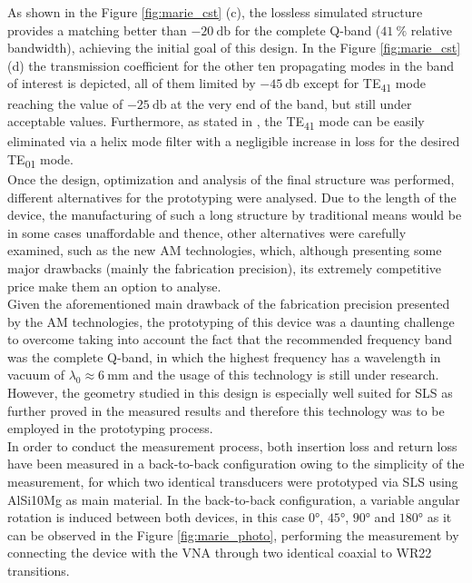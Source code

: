 \documentclass[english,twoside]{article}
\begin{document}
    As shown in the Figure \ref{fig:marie_cst} (c), the lossless simulated structure provides a matching better than $\SI{-20}{\decibel}$ for the complete Q-band ($\SI{41}{\percent}$ relative bandwidth), achieving the initial goal of this design. In the Figure \ref{fig:marie_cst} (d) the transmission coefficient for the other ten propagating modes in the band of interest is depicted, all of them limited by $\SI{-45}{\decibel}$ except for \ac{TE}\textsubscript{41} mode reaching the value of $\SI{-25}{\decibel}$ at the very end of the band, but still under acceptable values. Furthermore, as stated in \cite{saad}, the \ac{TE}\textsubscript{41} mode can be easily eliminated via a helix mode filter with a negligible increase in loss for the desired \ac{TE}\textsubscript{01} mode.\\
    
    Once the design, optimization and analysis of the final structure was performed, different alternatives for the prototyping were analysed. Due to the length of the device, the manufacturing of such a long structure by traditional means would be in some cases unaffordable and thence, other alternatives were carefully examined, such as the new \ac{AM} technologies, which, although presenting some major drawbacks (mainly the fabrication precision), its extremely competitive price make them an option to analyse.\\
    
    Given the aforementioned main drawback of the fabrication precision presented by the \ac{AM} technologies, the prototyping of this device was a daunting challenge to overcome taking into account the fact that the recommended frequency band was the complete Q-band, in which the highest frequency has a wavelength in vacuum of $\lambda_0\approx\SI{6}{\milli\metre}$ and the usage of this technology is still under research. However, the geometry studied in this design is especially well suited for \ac{SLS} as further proved in the measured results \cite{gonzalez} and therefore this technology was to be employed in the prototyping process.\\
    
    In order to conduct the measurement process, both insertion loss and return loss have been measured in a back-to-back configuration owing to the simplicity of the measurement, for which two identical transducers were prototyped via \ac{SLS} using AlSi10Mg as main material. In the back-to-back configuration, a variable angular rotation is induced between both devices, in this case $\ang{0}$, $\ang{45}$, $\ang{90}$ and $\ang{180}$ as it can be observed in the Figure \ref{fig:marie_photo}, performing the measurement by connecting the device with the \ac{VNA} through two identical coaxial to \ac{WR}22 transitions.\\
    
\end{document}
